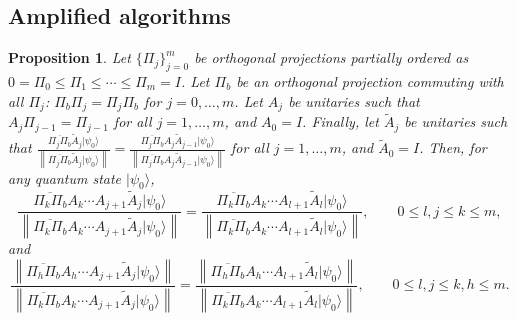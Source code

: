 \documentclass[letterpaper,onecolumn,11pt,accepted=2026-02-14]{quantumarticle}
\newcommand{\norm}[1]{\left\lVert#1\right\rVert}
\newtheorem{proposition}[lemma]{Proposition}
\theoremstyle{remark}
\theoremstyle{plain}
\newcommand{\ket}[1]{|#1\rangle}
\begin{document}
\subsection{Amplified algorithms}
\label{append:axiom_amp}
\begin{proposition}
Let $\{\Pi_j\}_{j=0}^m$ be orthogonal projections partially ordered as  $0=\Pi_0\leq\Pi_1\leq\cdots\leq\Pi_m=I$.
Let $\Pi_b$ be an orthogonal projection commuting with all $\Pi_j$: $\Pi_b\Pi_j=\Pi_j\Pi_b$ for $j=0,\ldots, m$.
Let $A_j$ be unitaries such that $A_j\Pi_{j-1}=\Pi_{j-1}$ for all $j=1,\ldots, m$, and $A_0=I$.
Finally, let $\widetilde A_j$ be unitaries such that $\frac{\overline{\Pi_j\Pi_b}\widetilde{A}_j\ket{\psi_0}}{\norm{\overline{\Pi_j\Pi_b}\widetilde{A}_j\ket{\psi_0}}}
    =\frac{\overline{\Pi_j\Pi_b}A_j\widetilde{A}_{j-1}\ket{\psi_0}}{\norm{\overline{\Pi_j\Pi_b}A_j\widetilde{A}_{j-1}\ket{\psi_0}}}$ for all $j=1,\ldots, m$, and $\widetilde A_0=I$.
Then, for any quantum state $\ket{\psi_0}$,
\begin{equation}
    \frac{\overline{\Pi_{k}\Pi_b}A_k\cdots A_{j+1}\widetilde{A}_{j}\ket{\psi_0}}{\norm{\overline{\Pi_{k}\Pi_b}A_k\cdots A_{j+1}\widetilde{A}_{j}\ket{\psi_0}}}
        =\frac{\overline{\Pi_{k}\Pi_b}A_k\cdots A_{l+1}\widetilde{A}_l\ket{\psi_0}}{\norm{\overline{\Pi_{k}\Pi_b}A_k\cdots A_{l+1}\widetilde{A}_l\ket{\psi_0}}},\qquad 0\leq l,j\leq k\leq m,
\end{equation}
and
\begin{equation}
    \frac{\norm{\overline{\Pi_{h}\Pi_b}A_{h}\cdots A_{j+1}\widetilde{A}_{j}\ket{\psi_0}}}{\norm{\overline{\Pi_{k}\Pi_b}A_{k}\cdots A_{j+1}\widetilde{A}_{j}\ket{\psi_0}}}
    =\frac{\norm{\overline{\Pi_{h}\Pi_b}A_{h}\cdots A_{l+1}\widetilde{A}_{l}\ket{\psi_0}}}{\norm{\overline{\Pi_{k}\Pi_b}A_{k}\cdots A_{l+1}\widetilde{A}_{l}\ket{\psi_0}}},\qquad
    0\leq l,j\leq k,h\leq m.
\end{equation}
\end{proposition}
\end{document}
